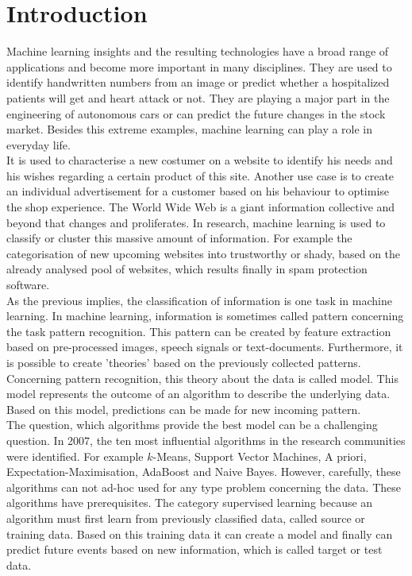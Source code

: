 \chapter{Introduction}
Machine learning insights and the resulting technologies have a broad range of applications and become more important in many disciplines.
They are used to identify handwritten numbers from an image or predict whether a hospitalized patients will get and heart attack or not. 
They are playing a major part in the engineering of autonomous cars or can predict the future changes in the stock market.
Besides this extreme examples, machine learning can play a role in everyday life.\\
It is used to characterise a new costumer on a website to identify his needs and his wishes regarding a certain product of this site.
Another use case is to create an individual advertisement for a customer based on his behaviour to optimise the shop experience.
The World Wide Web is a giant information collective and beyond that changes and proliferates.
In research, machine learning is used to classify or cluster this massive amount of information.
For example the categorisation of new upcoming websites into trustworthy or shady, based on the already analysed pool of websites, which results finally in spam protection software.\\
As the previous implies, the classification of information is one task in machine learning.
In machine learning, information is sometimes called pattern concerning the task pattern recognition.
This pattern can be created by feature extraction based on pre-processed images, speech signals or text-documents.
Furthermore, it is possible to create 'theories' based on the previously collected patterns.
Concerning pattern recognition, this theory about the data is called model. 
This model represents the outcome of an algorithm to describe the underlying data.
Based on this model, predictions can be made for new incoming pattern.\\
The question, which algorithms provide the best model can be a challenging question.
In 2007, the ten most influential algorithms in the research communities were identified.
For example $k$-Means, Support Vector Machines, A priori, Expectation-Maximisation, AdaBoost and Naive Bayes.
However, carefully, these algorithms can not ad-hoc used for any type problem concerning the data.
These algorithms have prerequisites.
The category supervised learning because an algorithm must first learn from previously classified data, called source or training data. Based on this training data it can create a model and finally can predict future events based on new information, which is called target or test data.
